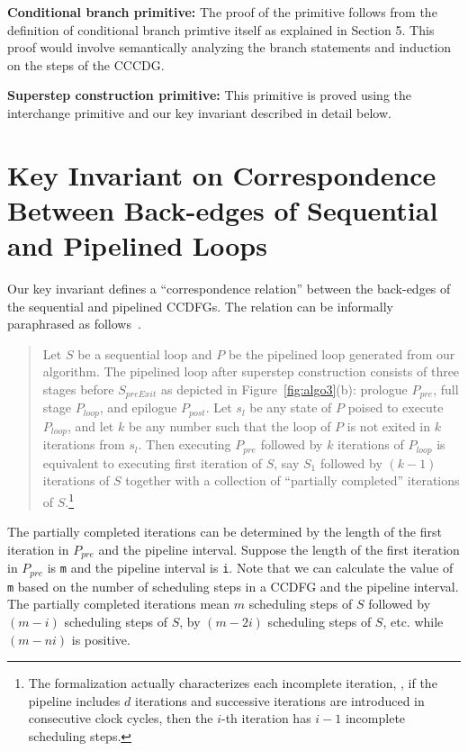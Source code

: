   {\bf Conditional branch primitive:} The proof of the primitive follows from the definition of conditional branch primtive itself
  as explained in Section 5. This proof would involve semantically analyzing the branch statements
  and induction on the steps of the CCCDG.

{\bf Superstep construction primitive:} This primitive is proved
using the interchange primitive and our key invariant described in detail below.


\section{Key Invariant on Correspondence Between Back-edges of Sequential and Pipelined Loops}
 Our key invariant defines a ``correspondence relation''
between the back-edges of the sequential and pipelined CCDFGs.
The relation can be informally paraphrased as
follows~\cite{disha-itp14}.

\begin{quote}
Let $S$ be a sequential loop and $P$ be the pipelined loop
generated from our algorithm. The pipelined loop after superstep construction
consists of
three stages before $S_{preExit}$ as depicted in
Figure~\ref{fig:algo3}(b): prologue $P_{pre}$, full stage
$P_{loop}$, and epilogue $P_{post}$.  Let $s_l$ be any state of $P$
poised to execute $P_{loop}$, and let $k$ be any number such that
the loop of $P$ is not exited in $k$ iterations from $s_l$.
Then executing $P_{pre}$ followed by $k$ iterations of $P_{loop}$ is
equivalent to executing first iteration of $S$, say $S_1$
followed by $(k - 1)$ iterations of $S$ together with a
collection of ``partially completed'' iterations of
$S$.\footnote{The formalization actually characterizes each
  incomplete iteration, \eg, if the pipeline includes $d$
  iterations and successive iterations are introduced in
  consecutive clock cycles, then the $i$-th iteration has $i
  - 1$ incomplete scheduling steps.}
\end{quote}

The partially completed iterations can be determined by the
length of the first iteration in $P_{pre}$ and the pipeline interval.
Suppose the length of the first iteration in $P_{pre}$
is {\tt m} and the pipeline interval is {\tt i}. Note that we
can calculate the value of {\tt m} based on the number of scheduling steps in a CCDFG
and the pipeline interval. The partially completed iterations mean $m$
scheduling steps of $S$ followed by $(m-i)$ scheduling steps of $S$, by
$(m-2i)$ scheduling steps of $S$, etc. while $(m-ni)$ is positive.

